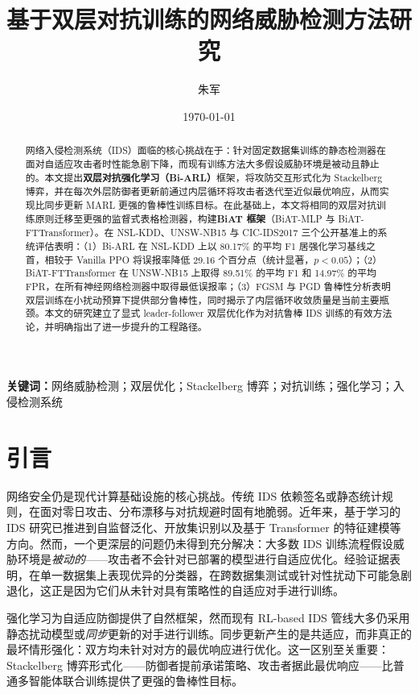\documentclass[12pt,a4paper]{ctexart}
\title{基于双层对抗训练的网络威胁检测方法研究}
\author{朱军}
\date{\today}
\begin{document}
\maketitle

\begin{abstract}
网络入侵检测系统（IDS）面临的核心挑战在于：针对固定数据集训练的静态检测器在面对自适应攻击者时性能急剧下降，而现有训练方法大多假设威胁环境是被动且静止的。本文提出\textbf{双层对抗强化学习（Bi-ARL）}框架，将攻防交互形式化为 Stackelberg 博弈，并在每次外层防御者更新前通过内层循环将攻击者迭代至近似最优响应，从而实现比同步更新 MARL 更强的鲁棒性训练目标。在此基础上，本文将相同的双层对抗训练原则迁移至更强的监督式表格检测器，构建\textbf{BiAT 框架}（BiAT-MLP 与 BiAT-FTTransformer）。在 NSL-KDD、UNSW-NB15 与 CIC-IDS2017 三个公开基准上的系统评估表明：（1）Bi-ARL 在 NSL-KDD 上以 80.17\% 的平均 F1 居强化学习基线之首，相较于 Vanilla PPO 将误报率降低 29.16 个百分点（统计显著，$p<0.05$）；（2）BiAT-FTTransformer 在 UNSW-NB15 上取得 89.51\% 的平均 F1 和 14.97\% 的平均 FPR，在所有神经网络检测器中取得最低误报率；（3）FGSM 与 PGD 鲁棒性分析表明双层训练在小扰动预算下提供部分鲁棒性，同时揭示了内层循环收敛质量是当前主要瓶颈。本文的研究建立了显式 leader-follower 双层优化作为对抗鲁棒 IDS 训练的有效方法论，并明确指出了进一步提升的工程路径。
\end{abstract}

\noindent\textbf{关键词：}网络威胁检测；双层优化；Stackelberg 博弈；对抗训练；强化学习；入侵检测系统

\section{引言}

网络安全仍是现代计算基础设施的核心挑战。传统 IDS 依赖签名或静态统计规则，在面对零日攻击、分布漂移与对抗规避时固有地脆弱。近年来，基于学习的 IDS 研究已推进到自监督泛化、开放集识别以及基于 Transformer 的特征建模等方向\cite{liao2024survey,golchin2024ssclids,xi2024idsmtran}。然而，一个更深层的问题仍未得到充分解决：大多数 IDS 训练流程假设威胁环境是\emph{被动的}——攻击者不会针对已部署的模型进行自适应优化。经验证据表明，在单一数据集上表现优异的分类器，在跨数据集测试或针对性扰动下可能急剧退化\cite{cantone2024crossdataset,wang2023robustnessnids}，这正是因为它们从未针对具有策略性的自适应对手进行训练。

强化学习为自适应防御提供了自然框架，然而现有 RL-based IDS 管线大多仍采用静态扰动模型或\emph{同步}更新的对手进行训练。同步更新产生的是共适应，而非真正的最坏情形强化：双方均未针对对方的最优响应进行优化。这一区别至关重要：Stackelberg 博弈形式化——防御者提前承诺策略、攻击者据此最优响应——比普通多智能体联合训练提供了更强的鲁棒性目标。
\end{document}

